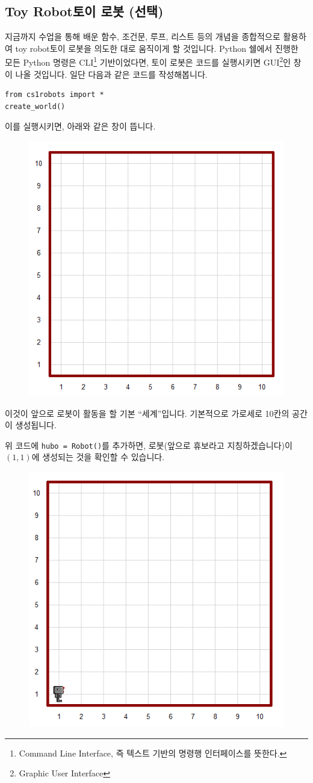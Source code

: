 \documentclass[../main.tex]{subfiles}
\begin{document}
\subsection{Toy Robot토이 로봇 (선택)}
지금까지 수업을 통해 배운 함수, 조건문, 루프, 리스트 등의 개념을 종합적으로 활용하여 toy robot토이 로봇을 의도한 대로 움직이게 할 것입니다.
Python 쉘에서 진행한 모든 Python 명령은 CLI\footnote{Command Line Interface, 즉 텍스트 기반의 명령행 인터페이스를 뜻한다.} 기반이었다면, 토이 로봇은 코드를 실행시키면 GUI\footnote{Graphic User Interface}인 창이 나올 것입니다.
일단 다음과 같은 코드를 작성해봅니다.
\begin{verbatim}
from cs1robots import *
create_world()
\end{verbatim}
이를 실행시키면, 아래와 같은 창이 뜹니다.
\begin{figure}[H]
\centering
\includegraphics[width=0.5\linewidth]{"./lectures/lecture4_emptyworld"}
\label{fig:lecture4emptyworld}
\end{figure}
이것이 앞으로 로봇이 활동을 할 기본 ``세계''입니다.
기본적으로 가로세로 10칸의 공간이 생성됩니다.

위 코드에 \texttt{hubo = Robot()}를 추가하면, 로봇(앞으로 휴보라고 지칭하겠습니다)이 $(1, 1)$에 생성되는 것을 확인할 수 있습니다.
\begin{figure}[H]
\centering
\includegraphics[width=0.5\linewidth]{"./lectures/lecture4_hubo"}
\label{fig:lecture4hubo}
\end{figure}
\end{document}
